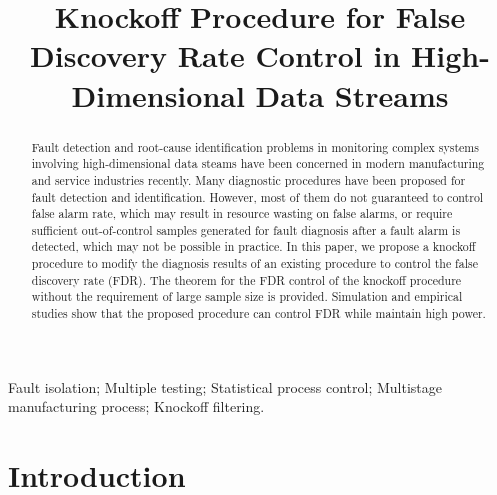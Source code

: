 \documentclass[]{interact}
\theoremstyle{plain}%
\theoremstyle{definition}
\theoremstyle{remark}
\begin{document}

\title{Knockoff Procedure for False Discovery Rate Control in High-Dimensional Data Streams}

\author{
}

\maketitle

\begin{abstract}
Fault detection and root-cause identification problems in monitoring complex systems involving high-dimensional data steams have been concerned in modern manufacturing and service industries recently. Many diagnostic procedures have been proposed for fault detection and identification. However, most of them do not guaranteed to control false alarm rate, which may result in resource wasting on false alarms, or require sufficient out-of-control samples generated for fault diagnosis after a fault alarm is detected, which may not be possible in practice. In this paper, we propose a knockoff procedure to modify the diagnosis results of an existing procedure to control the false discovery rate (FDR). The theorem for the FDR control of the knockoff procedure without the requirement of large sample size is provided. Simulation and empirical studies show that the proposed procedure can control FDR while maintain high power. 
\end{abstract}

\begin{keywords}
Fault isolation; Multiple testing; Statistical process control; Multistage manufacturing process; Knockoff filtering.
\end{keywords}

\section{Introduction}\label{introduction}
\end{document}

